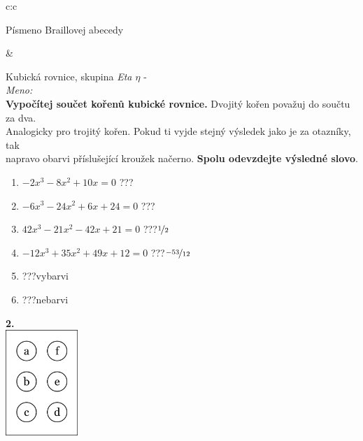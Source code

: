 \documentclass[10pt]{report}
\begin{document}
\begin{tabular}{c:c}
\begin{minipage}[c][99mm][t]{0.49\linewidth}
\begin{center}
\begin{minipage}{0.20\linewidth}
\begin{center}
{\small Písmeno Braillovej abecedy}
\end{center}
\end{minipage}
\end{center}
\end{minipage}
&
\begin{minipage}[c][99mm][t]{0.49\linewidth}
\begin{center}
\vspace{7mm}
{\huge Kubická rovnice, skupina \textit{Eta $\eta$} -}\\[4.5mm]
\textit{Meno:}\phantom{xxxxxxxxxxxxxxxxxxxxxxxxxxxxxxxxxxxxxxxxxxxxxxxxxxxxxxxxxxxxxxxxx}\\[3.5mm]
\textbf{Vypočítej součet kořenů kubické rovnice.} Dvojitý kořen považuj do součtu za dva.\\Analogicky pro trojitý kořen. Pokud ti vyjde stejný výsledek jako je za otazníky, tak\\napravo obarvi příslušející kroužek načerno. \textbf{Spolu odevzdejte výsledné slovo}.\\[3mm]
\begin{minipage}{0.77\linewidth}
\begin{center}
\begin{varwidth}{\textwidth}
\begin{enumerate}
\large
\item $-2x^3-8x^2+10x=0$\quad \dotfill\; ???\;\dotfill {}
\item $-6x^3-24x^2+6x+24=0$\quad \dotfill\; ???\;\dotfill {}
\item $42x^3-21x^2-42x+21=0$\quad \dotfill\; ???\;\dotfill \quad $\nicefrac{1}{2}$
\item $-12x^3+35x^2+49x+12=0$\quad \dotfill\; ???\;\dotfill \quad $\nicefrac{-53}{12}$
\item \quad \dotfill\; ???\;\dotfill \quad vybarvi
\item \quad \dotfill\; ???\;\dotfill \quad nebarvi
\end{enumerate}
\end{varwidth}
\end{center}
\end{minipage}
\begin{minipage}{0.20\linewidth}
\begin{center}
{\Huge\bfseries 2.} \\[2mm]
\includegraphics[height=40mm]{../images/braille.png}

\end{center}
\end{minipage}
\end{center}
\end{minipage}
\end{tabular}
\end{document}
